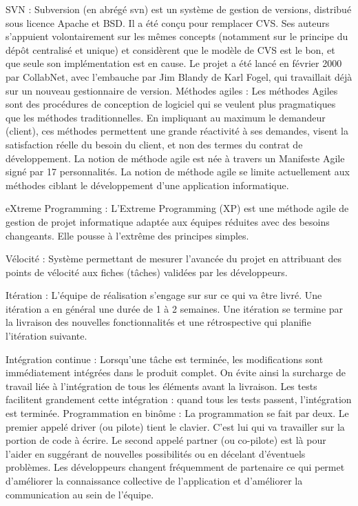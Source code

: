 \documentclass{article}
\begin{document}
SVN : Subversion (en abrégé svn) est un système de gestion de versions, distribué sous licence Apache et BSD. Il a été conçu pour remplacer CVS. Ses auteurs s'appuient volontairement sur les mêmes concepts (notamment sur le principe du dépôt centralisé et unique) et considèrent que le modèle de CVS est le bon, et que seule son implémentation est en cause. Le projet a été lancé en février 2000 par CollabNet, avec l'embauche par Jim Blandy de Karl Fogel, qui travaillait déjà sur un nouveau gestionnaire de version. 
Méthodes agiles : Les méthodes Agiles sont des procédures de conception de logiciel qui se veulent plus pragmatiques que les méthodes traditionnelles. En impliquant au maximum le demandeur (client), ces méthodes permettent une grande réactivité à ses demandes, visent la satisfaction réelle du besoin du client, et non des termes du contrat de développement. La notion de méthode agile est née à travers un Manifeste Agile signé par 17 personnalités. La notion de méthode agile se limite actuellement aux méthodes ciblant le développement d'une application informatique.

eXtreme Programming : L'Extreme Programming (XP) est une méthode agile de gestion de projet informatique adaptée aux équipes réduites avec des besoins changeants. Elle pousse à l'extrême des principes simples. 

Vélocité : Système permettant de mesurer l'avancée du projet en attribuant des points de vélocité aux fiches (t\^aches) validées par les développeurs.

Itération : L'équipe de réalisation s'engage sur sur ce qui va être livré. Une itération a en général une durée de 1 à 2 semaines. Une itération se termine par la livraison des nouvelles fonctionnalités et une rétrospective qui planifie l'itération suivante.

Intégration continue : Lorsqu'une t\^ache est terminée, les modifications sont immédiatement intégrées dans le produit complet. On évite ainsi la surcharge de travail liée à l'intégration de tous les éléments avant la livraison. Les tests facilitent grandement cette intégration : quand tous les tests passent, l'intégration est terminée. 
Programmation en bin\^ome : La programmation se fait par deux. Le premier appelé driver (ou pilote) tient le clavier. C'est lui qui va travailler sur la portion de code à écrire. Le second appelé partner (ou co-pilote) est là pour l'aider en suggérant de nouvelles possibilités ou en décelant d'éventuels problèmes. Les développeurs changent fréquemment de partenaire ce qui permet d'améliorer la connaissance collective de l'application et d'améliorer la communication au sein de l'équipe. 
\end{document}
